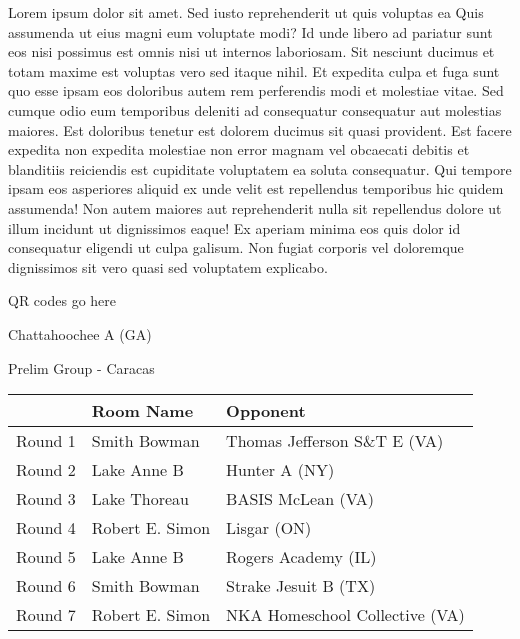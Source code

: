 \documentclass{article}%
\begin{document}
\vspace*{8pt}%
\linebreak%
\newline%
\newline%
Lorem ipsum dolor sit amet. Sed iusto reprehenderit ut quis voluptas ea Quis assumenda ut eius magni eum voluptate modi? Id unde libero ad pariatur sunt eos nisi possimus est omnis nisi ut internos laboriosam. Sit nesciunt ducimus et totam maxime est voluptas vero sed itaque nihil. Et expedita culpa et fuga sunt quo esse ipsam eos doloribus autem rem perferendis modi et molestiae vitae.\newline%
\newline%
Sed cumque odio eum temporibus deleniti ad consequatur consequatur aut molestias maiores. Est doloribus tenetur est dolorem ducimus sit quasi provident. Est facere expedita non expedita molestiae non error magnam vel obcaecati debitis et blanditiis reiciendis est cupiditate voluptatem ea soluta consequatur. Qui tempore ipsam eos asperiores aliquid ex unde velit est repellendus temporibus hic quidem assumenda!\newline%
\newline%
Non autem maiores aut reprehenderit nulla sit repellendus dolore ut illum incidunt ut dignissimos eaque! Ex aperiam minima eos quis dolor id consequatur eligendi ut culpa galisum. Non fugiat corporis vel doloremque dignissimos sit vero quasi sed voluptatem explicabo.\newline%
\newline%
%
\vspace*{30pt}%
\begin{center}%
\begin{Huge}%
QR codes go here%
\end{Huge}%
\end{center}%
\newpage%
%
\begin{center}%
\begin{Huge}%
Chattahoochee A (GA)%
\end{Huge}%
\vspace*{8pt}%
\linebreak%
\begin{Large}%
Prelim Group {-} Caracas%
\end{Large}%
\end{center}%
\begin{tabularx}{\textwidth}{|c|Y|Y|}%
\hline%
&Room Name&Opponent\\%
\hline%
Round 1&Smith Bowman&Thomas Jefferson S\&T E (VA)\\%
Round 2&Lake Anne B&Hunter A (NY)\\%
Round 3&Lake Thoreau&BASIS McLean (VA)\\%
Round 4&Robert E. Simon&Lisgar (ON)\\%
Round 5&Lake Anne B&Rogers Academy (IL)\\%
Round 6&Smith Bowman&Strake Jesuit B (TX)\\%
Round 7&Robert E. Simon&NKA Homeschool Collective (VA)\\%
\hline%
\end{tabularx}%
\end{document}
